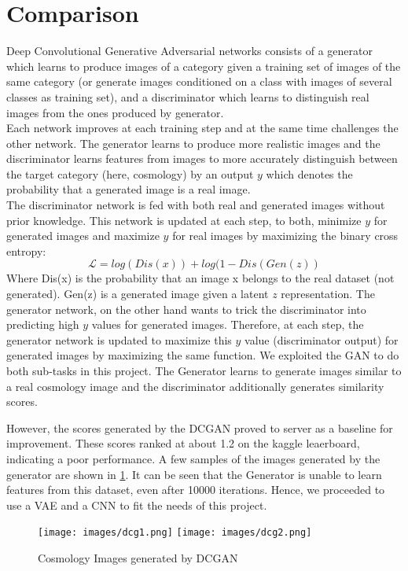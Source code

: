 \documentclass[journal]{IEEEtran}
\begin{document}
\section{Comparison}
Deep Convolutional Generative Adversarial networks consists of a generator which learns to produce images of a category given a training set of images of the same category (or generate images conditioned on a class with images of several classes as training set), and a discriminator which learns to distinguish real images from the ones produced by generator.\\
Each network improves at each training step and at the same time challenges the other network. The generator learns to produce more realistic images and the discriminator learns features from images to more accurately distinguish between the target category (here, cosmology) by an output $y$ which denotes the probability that a generated image is a real image. \\
The discriminator network is fed with both real and generated images without prior knowledge. This network is updated at each step, to both, minimize $y$ for generated images and maximize $y$ for real images by maximizing the binary cross entropy\cite{AEVB}:
\begin{equation}
\mathcal{L} = log(Dis(x)) + log(1-Dis(Gen(z))
\end{equation}
Where Dis(x) is the probability that an image x belongs to the real dataset (not generated). Gen(z) is a generated image given a latent $z$ representation.
The generator network, on the other hand wants to trick the discriminator into predicting high $y$ values for generated images. Therefore, at each step, the generator network is updated to maximize this $y$ value (discriminator output) for generated images by maximizing the same function.
We exploited the GAN to do both sub-tasks in this project. The Generator learns to generate images similar to a real cosmology image and the discriminator additionally generates similarity scores.

However, the scores generated by the DCGAN proved to server as a baseline for improvement. These scores ranked at about 1.2 on the kaggle leaerboard, indicating a poor performance. A few samples of the images generated by the generator are shown in \ref{fig:DCGImages}. It can be seen that the Generator is unable to learn features from this dataset, even after 10000 iterations. Hence, we proceeded to use a VAE and a CNN to fit the needs of this project.


\begin{figure}[H]
\begin{center}
   \texttt{[image: images/dcg1.png]}
   \texttt{[image: images/dcg2.png]}
   \caption{Cosmology Images generated by DCGAN}
\end{center}
\label{fig:DCGImages}
\end{figure}
\end{document}
